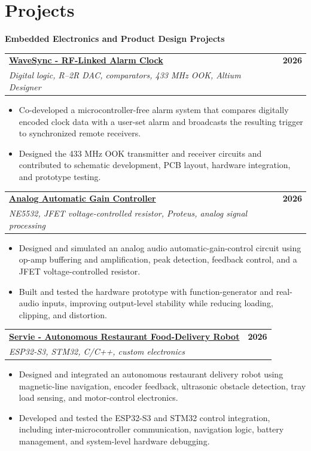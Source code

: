 \documentclass[a4paper,10pt]{article}
\makeatletter
\newcommand{\projectEntry}[3]{%
  \Needspace{9\baselineskip}%
  \begin{tabularx}{\textwidth}{@{}Xr@{}}
    \textbf{#1} & \textbf{\small #3} \\
    {\small\textit{#2}} &
  \end{tabularx}
  \vspace{0.35mm}
}
\newcommand{\projectCategory}[1]{%
  \vspace{1.0mm}
  {\normalsize\bfseries\color{accent} #1}\par
  \vspace{0.75mm}
}
\makeatother
\begin{document}
\section{Projects}

\projectCategory{Embedded Electronics and Product Design Projects}

\projectEntry
  {\href{https://github.com/hakammra/wavesync-rf-alarm}  {WaveSync - RF-Linked Alarm Clock \faGithub}}
  {Digital logic, R--2R DAC, comparators, 433 MHz OOK, Altium Designer}
  {2026}
\begin{itemize}
  \item Co-developed a microcontroller-free alarm system that compares digitally encoded clock data with a user-set alarm and broadcasts the resulting trigger to synchronized remote receivers.
  \item Designed the 433 MHz OOK transmitter and receiver circuits and contributed to schematic development, PCB layout, hardware integration, and prototype testing.
\end{itemize}
\vspace{1.35mm}

\projectEntry
  {\href{https://github.com/hakammra/automatic-gain-controller}{Analog Automatic Gain Controller \faGithub}}
  {NE5532, JFET voltage-controlled resistor, Proteus, analog signal processing}
  {2026}
\begin{itemize}
  \item Designed and simulated an analog audio automatic-gain-control circuit using op-amp buffering and amplification, peak detection, feedback control, and a JFET voltage-controlled resistor.
  \item Built and tested the hardware prototype with function-generator and real-audio inputs, improving output-level stability while reducing loading, clipping, and distortion.
\end{itemize}
\vspace{1.35mm}

\projectEntry
  {\href{https://github.com/hakammra/Restaurent-Robot}{Servie - Autonomous Restaurant Food-Delivery Robot \faGithub}}
  {ESP32-S3, STM32, C/C++, custom electronics}
  {2026}
\begin{itemize}
  \item Designed and integrated an autonomous restaurant delivery robot using magnetic-line navigation, encoder feedback, ultrasonic obstacle detection, tray load sensing, and motor-control electronics.
  \item Developed and tested the ESP32-S3 and STM32 control integration, including inter-microcontroller communication, navigation logic, battery management, and system-level hardware debugging.
\end{itemize}
\vspace{1.35mm}
\end{document}
